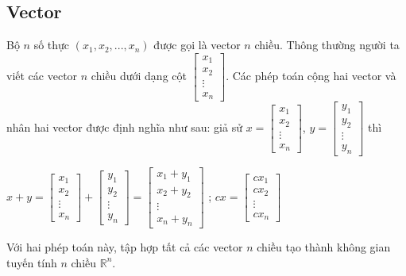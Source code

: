 \documentclass[12pt,a4paper]{report}
\begin{document}
	\subsection{Vector}
	Bộ $n$ số thực $(x_1, x_2, ..., x_n)$ được gọi là vector $n$ chiều. Thông thường người ta viết các vector $n$ chiều dưới dạng cột
	$ \begin{bmatrix}
	x_1\\x_2\\\vdots\\x_n
	\end{bmatrix}$. Các phép toán cộng hai vector và nhân hai vector được định nghĩa như sau: giả sử $x = \begin{bmatrix}
	x_1\\x_2 \\\vdots \\x_n
	\end{bmatrix}$, $y = \begin{bmatrix}
	y_1\\y_2 \\\vdots \\y_n
	\end{bmatrix}$ thì \begin{center}
		$x + y = \begin{bmatrix}
		x_1\\x_2\\\vdots\\x_n
		\end{bmatrix} + \begin{bmatrix}
		y_1\\y_2\\\vdots\\ y_n
		\end{bmatrix} = \begin{bmatrix}
		x_1+y_1\\x_2 + y_2\\\vdots\\x_n + y_n
		\end{bmatrix}$ ; $cx = \begin{bmatrix}
		cx_1\\cx_2\\\vdots\\cx_n
		\end{bmatrix}$
	\end{center} 
	Với hai phép toán này, tập hợp tất cả các vector $n$ chiều tạo thành không gian tuyến tính $n$ chiều $\mathbb{R}^n$.
\end{document}
